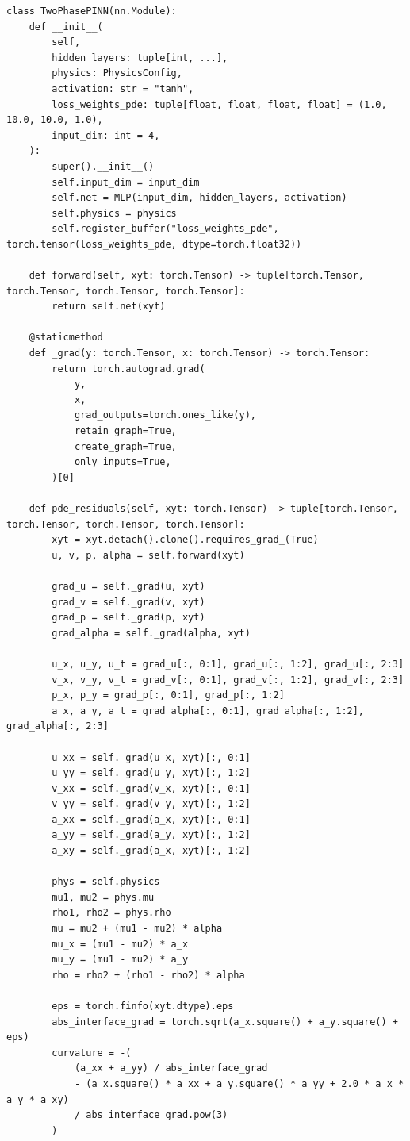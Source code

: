 \begin{lstlisting}
class TwoPhasePINN(nn.Module):
    def __init__(
        self,
        hidden_layers: tuple[int, ...],
        physics: PhysicsConfig,
        activation: str = "tanh",
        loss_weights_pde: tuple[float, float, float, float] = (1.0, 10.0, 10.0, 1.0),
        input_dim: int = 4,
    ):
        super().__init__()
        self.input_dim = input_dim
        self.net = MLP(input_dim, hidden_layers, activation)
        self.physics = physics
        self.register_buffer("loss_weights_pde", torch.tensor(loss_weights_pde, dtype=torch.float32))

    def forward(self, xyt: torch.Tensor) -> tuple[torch.Tensor, torch.Tensor, torch.Tensor, torch.Tensor]:
        return self.net(xyt)

    @staticmethod
    def _grad(y: torch.Tensor, x: torch.Tensor) -> torch.Tensor:
        return torch.autograd.grad(
            y,
            x,
            grad_outputs=torch.ones_like(y),
            retain_graph=True,
            create_graph=True,
            only_inputs=True,
        )[0]

    def pde_residuals(self, xyt: torch.Tensor) -> tuple[torch.Tensor, torch.Tensor, torch.Tensor, torch.Tensor]:
        xyt = xyt.detach().clone().requires_grad_(True)
        u, v, p, alpha = self.forward(xyt)

        grad_u = self._grad(u, xyt)
        grad_v = self._grad(v, xyt)
        grad_p = self._grad(p, xyt)
        grad_alpha = self._grad(alpha, xyt)

        u_x, u_y, u_t = grad_u[:, 0:1], grad_u[:, 1:2], grad_u[:, 2:3]
        v_x, v_y, v_t = grad_v[:, 0:1], grad_v[:, 1:2], grad_v[:, 2:3]
        p_x, p_y = grad_p[:, 0:1], grad_p[:, 1:2]
        a_x, a_y, a_t = grad_alpha[:, 0:1], grad_alpha[:, 1:2], grad_alpha[:, 2:3]

        u_xx = self._grad(u_x, xyt)[:, 0:1]
        u_yy = self._grad(u_y, xyt)[:, 1:2]
        v_xx = self._grad(v_x, xyt)[:, 0:1]
        v_yy = self._grad(v_y, xyt)[:, 1:2]
        a_xx = self._grad(a_x, xyt)[:, 0:1]
        a_yy = self._grad(a_y, xyt)[:, 1:2]
        a_xy = self._grad(a_x, xyt)[:, 1:2]

        phys = self.physics
        mu1, mu2 = phys.mu
        rho1, rho2 = phys.rho
        mu = mu2 + (mu1 - mu2) * alpha
        mu_x = (mu1 - mu2) * a_x
        mu_y = (mu1 - mu2) * a_y
        rho = rho2 + (rho1 - rho2) * alpha

        eps = torch.finfo(xyt.dtype).eps
        abs_interface_grad = torch.sqrt(a_x.square() + a_y.square() + eps)
        curvature = -(
            (a_xx + a_yy) / abs_interface_grad
            - (a_x.square() * a_xx + a_y.square() * a_yy + 2.0 * a_x * a_y * a_xy)
            / abs_interface_grad.pow(3)
        )


\end{lstlisting}
